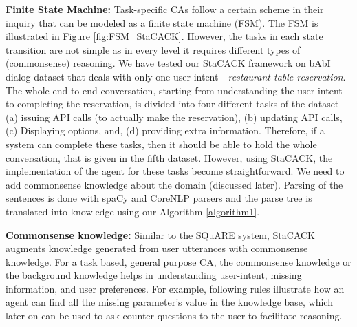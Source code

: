 \documentclass[letterpaper]{article}
\begin{document}
\noindent\textbf{\underline{Finite State Machine:}}
Task-specific CAs follow a certain scheme in their inquiry that can be modeled as a finite state machine (FSM).
The FSM is illustrated in Figure \ref{fig:FSM_StaCACK}. However, the tasks in each state transition are not simple as in every level it requires different types of (commonsense) reasoning. We have tested our StaCACK framework on bAbI dialog dataset that deals with only one user intent - \textit{restaurant table reservation}. The whole end-to-end conversation, starting from understanding the user-intent to completing the reservation, is divided into four different tasks of the dataset - (a) issuing API calls (to actually make the reservation), (b) updating API calls, (c) Displaying options, and, (d) providing extra information. Therefore, if a system can complete these tasks, then it should be able to hold the whole conversation, that is given in the fifth dataset. However, using StaCACK, the implementation of the agent for these tasks become straightforward. We need to add commonsense knowledge about the domain (discussed later). Parsing of the sentences is done with spaCy and CoreNLP parsers and the parse tree is translated into knowledge using our Algorithm \ref{algorithm1}.

\noindent\textbf{\underline{Commonsense knowledge:}}
Similar to the SQuARE system, StaCACK augments knowledge generated from user utterances with commonsense knowledge. For a task based, general purpose CA, the commonsense knowledge or the background knowledge helps in understanding user-intent, missing information, and user preferences. For example, following rules illustrate how an agent can find all the missing parameter's value in the knowledge base, which later on can be used to ask counter-questions to the user to facilitate reasoning.  

\noindent
\cprotect {}
\end{document}

